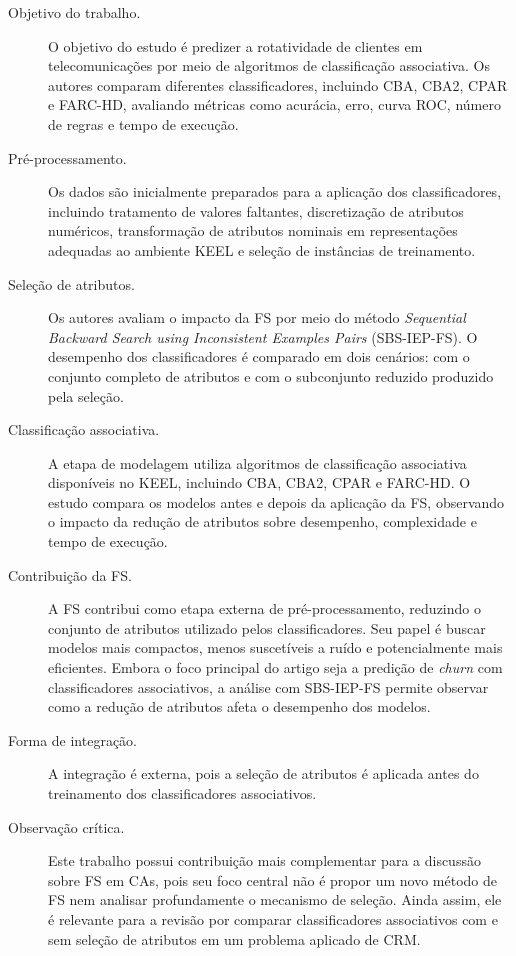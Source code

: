 \begin{description}
    \item[Objetivo do trabalho.] O objetivo do estudo é predizer a rotatividade de clientes em telecomunicações por meio de algoritmos de classificação associativa. Os autores comparam diferentes classificadores, incluindo CBA, CBA2, CPAR e FARC-HD, avaliando métricas como acurácia, erro, curva ROC, número de regras e tempo de execução.

    \item[Pré-processamento.] Os dados são inicialmente preparados para a aplicação dos classificadores, incluindo tratamento de valores faltantes, discretização de atributos numéricos, transformação de atributos nominais em representações adequadas ao ambiente KEEL e seleção de instâncias de treinamento.

    \item[Seleção de atributos.] Os autores avaliam o impacto da FS por meio do método \textit{Sequential Backward Search using Inconsistent Examples Pairs} (SBS-IEP-FS). O desempenho dos classificadores é comparado em dois cenários: com o conjunto completo de atributos e com o subconjunto reduzido produzido pela seleção.

    \item[Classificação associativa.] A etapa de modelagem utiliza algoritmos de classificação associativa disponíveis no KEEL, incluindo CBA, CBA2, CPAR e FARC-HD. O estudo compara os modelos antes e depois da aplicação da FS, observando o impacto da redução de atributos sobre desempenho, complexidade e tempo de execução.

    \item[Contribuição da FS.] A FS contribui como etapa externa de pré-processamento, reduzindo o conjunto de atributos utilizado pelos classificadores. Seu papel é buscar modelos mais compactos, menos suscetíveis a ruído e potencialmente mais eficientes. Embora o foco principal do artigo seja a predição de \textit{churn} com classificadores associativos, a análise com SBS-IEP-FS permite observar como a redução de atributos afeta o desempenho dos modelos.

    \item[Forma de integração.] A integração é externa, pois a seleção de atributos é aplicada antes do treinamento dos classificadores associativos.

    \item[Observação crítica.] Este trabalho possui contribuição mais complementar para a discussão sobre FS em CAs, pois seu foco central não é propor um novo método de FS nem analisar profundamente o mecanismo de seleção. Ainda assim, ele é relevante para a revisão por comparar classificadores associativos com e sem seleção de atributos em um problema aplicado de CRM.
\end{description}


